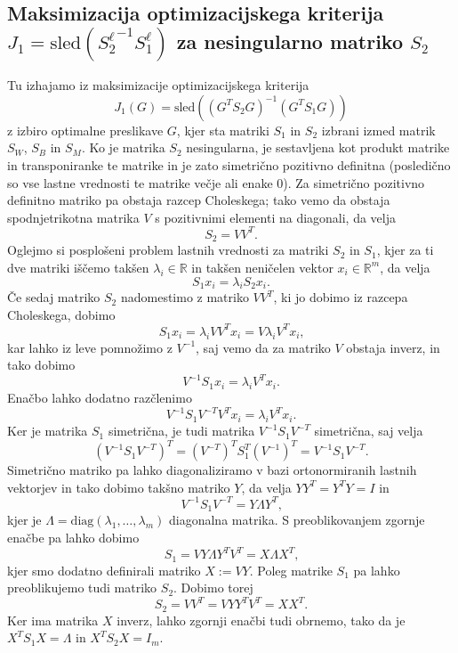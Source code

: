 \documentclass[mat1]{article}
\theoremstyle{definition}
\begin{document}
\subsection{Maksimizacija optimizacijskega kriterija $J_1 = \text{sled}({S^\ell_2}^{-1} S^\ell_1)$ za nesingularno matriko $S_2$}
Tu izhajamo iz maksimizacije optimizacijskega kriterija 
$$J_1(G) = \text{sled}\left((G^T S_2 G)^{-1} (G^T S_1 G)\right)$$
z izbiro optimalne preslikave $G$, kjer sta matriki $S_1$ in $S_2$ izbrani izmed matrik $S_W$, $S_B$ in $S_M$. Ko je matrika $S_2$ nesingularna, je sestavljena kot produkt matrike in transponiranke te matrike in je zato simetrično pozitivno definitna (posledično so vse lastne vrednosti te matrike večje ali enake 0). Za simetrično pozitivno definitno matriko pa obstaja razcep Choleskega; tako vemo da obstaja spodnjetrikotna matrika $V$ s pozitivnimi elementi na diagonali, da velja
$$ S_2 = V V^T \text{.}
$$
Oglejmo si posplošeni problem lastnih vrednosti za matriki $S_2$ in $S_1$, kjer za ti dve matriki iščemo takšen $\lambda_i \in \mathbb{R}$ in takšen neničelen vektor $x_i \in \mathbb{R}^m$, da velja
\begin{equation} \label{pos-prob-last-v}
S_1 x_i = \lambda_i S_2 x_i
\text{.}
\end{equation}
Če sedaj matriko $S_2$ nadomestimo z matriko $VV^T$, ki jo dobimo iz razcepa Choleskega, dobimo
$$
S_1 x_i = \lambda_i V V^T x_i = V \lambda_i V^T x_i
\text{,}
$$
kar lahko iz leve pomnožimo z $V^{-1}$, saj vemo da za matriko $V$ obstaja inverz, in tako dobimo
$$
V^{-1} S_1 x_i = \lambda_i V^T x_i
\text{.}
$$
Enačbo lahko dodatno razčlenimo
$$
V^{-1} S_1 V^{-T} V^T x_i = \lambda_i V^T x_i
\text{.}
$$
Ker je matrika $S_1$ simetrična, je tudi matrika $V^{-1} S_1 V^{-T}$ simetrična, saj velja
$$
(V^{-1} S_1 V^{-T})^T =  (V^{-T})^T S_1^T (V^{-1})^T =  V^{-1} S_1 V^{-T}
\text{.}
$$
Simetrično matriko pa lahko diagonaliziramo v bazi ortonormiranih lastnih vektorjev in tako dobimo takšno matriko $Y$, da velja $Y Y^T = Y^T Y = I $ in 
$$
V^{-1} S_1 V^{-T} = Y \Lambda Y^T
\text{,}
$$
kjer je $\Lambda = \text{diag}\left(\lambda_1, \ldots, \lambda_m \right)$ diagonalna matrika. S preoblikovanjem zgornje enačbe pa lahko dobimo
$$
S_1 = VY \Lambda Y^TV^T = X \Lambda X^T
\text{,}
$$
kjer smo dodatno definirali matriko $X := VY$.
Poleg matrike $S_1$ pa lahko preoblikujemo tudi matriko $S_2$. Dobimo torej
$$
S_2 = VV^T = VYY^TV^T = XX^T
\text{.}
$$
Ker ima matrika $X$ inverz, lahko zgornji enačbi tudi obrnemo, tako da je $X^T S_1 X = \Lambda$ in $X^T S_2 X = I_m$.
\end{document}

